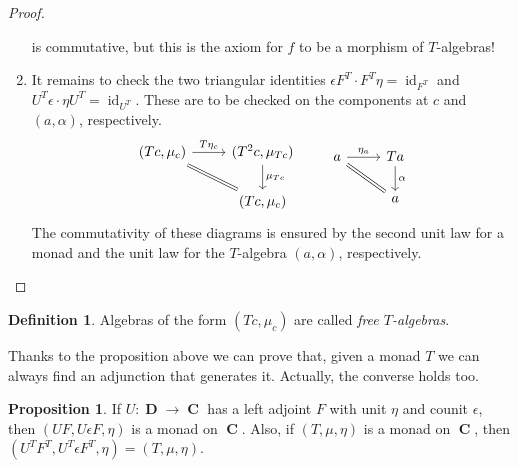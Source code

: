 \documentclass[a4paper,11pt,fullpage,oneside,openany]{amsbook}
\DeclareMathOperator{\C}{\mathbf{C}}
\DeclareMathOperator{\D}{\mathbf{D}}
\DeclareMathOperator{\id}{id}
\theoremstyle{definition}
\theoremstyle{definition}
\newtheorem{defn}[thm]{Definition} %
\newtheorem{prop}[thm]{Proposition}
\theoremstyle{remark}
\begin{document}
\begin{proof}
\begin{enumerate}[label=(\roman*)]
\[	\]
	is commutative, but this is the axiom for $f$ to be a morphism of $T$-algebras! 
	\item It remains to check the two triangular identities $\epsilon F^T \cdot F^T\eta=\id_{F^T}$ and $U^T\epsilon\cdot\eta U^T=\id_{U^T}$. These are to be checked on the components at $c$ and $(a, \alpha)$, respectively.
	\[
		\begin{tikzcd}
	(Tc,\mu_c)\ar["T\eta_{c}",rightarrow]{r}\ar[equal]{dr}
	& (T^2c,\mu_{Tc})\ar["\mu_{Tc}", rightarrow]{d}
	\\
	& (Tc,\mu_c)
	\end{tikzcd}	\quad\quad
	\begin{tikzcd}
	a\ar["\eta_a",rightarrow]{r}\ar[equal]{dr}
	& Ta\ar["\alpha", rightarrow]{d}
	\\
	& a
	\end{tikzcd}
	\]
	The commutativity of these diagrams is ensured by the second unit law for a monad and the unit law for the $T$-algebra $(a,\alpha)$, respectively. \qedhere
	\end{enumerate}
\end{proof}
\begin{defn}
Algebras of the form $(Tc, \mu_c)$ are called \emph{free $T$-algebras}.
\end{defn}
Thanks to the proposition above we can prove that, given a monad $T$ we can always find an adjunction that generates it. Actually, the converse holds too.
\begin{prop}
If $U\colon\D\to\C$ has a left adjoint $F$ with unit $\eta$ and counit $\epsilon$, then $(UF,U\epsilon F,\eta)$ is a monad on $\C$. Also, if $(T,\mu,\eta)$ is a monad on $\C$, then $(U^TF^T,U^T\epsilon F^T,\eta)=(T,\mu,\eta)$. 
\end{prop}
\end{document}
